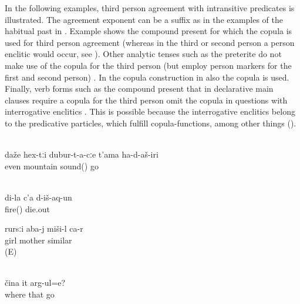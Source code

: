 In the following examples, third person agreement with intransitive predicates is illustrated. The agreement exponent can be a suffix as in the examples of the habitual past in . Example  shows the compound present for which the copula is used for third person agreement (whereas in the third or second person a person enclitic would occur, see ). Other analytic tenses such as the preterite do not make use of the copula for the third person (but employ person markers for the first and second person) . In the copula construction in  also the copula is used. Finally, verb forms such as the compound present that in declarative main clauses require a copula for the third person omit the copula in questions with interrogative enclitics . This is possible because the  interrogative enclitics belong to the predicative particles, which fulfill copula-functions, among other things ().
%
\begin{exe}
		\\	\label{ex:‎The sound went even to the mountains habitual past}
		\gll	daže	hex-tːi	dubur-t-a-cːe	t'ama	ha-d-aš-iri\\
			even		mountain	sound()	go\\
		\glt	{}
		
				\\	\label{ex:My fire died out preterite}
		\gll	di-la	c'a	d-iš-aq-un\\
				fire()	die.out\\
		\glt	{}
		
			\ex	\label{ex:The daughter is similar to her mother}
	\gll	rursːi	aba-j	miši-l ca-r\\
		girl	mother	similar \\
	\glt	{} (E)
		
		\\	\label{ex:Where is s/he going compound present}
		\gll	čina	it	arg-ul=e?\\
			where	that	go\\
		\glt	{}
\end{exe}

